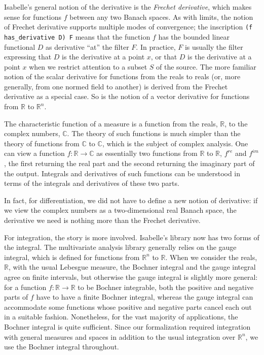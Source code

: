 \documentclass{svjour3}
\newcommand{\RR}{\mathbb{R}}
\newcommand{\CC}{\mathbb{C}}
\begin{document}
Isabelle's general notion of the derivative is the \emph{Frechet derivative}, which makes sense for functions $f$ between any two Banach spaces. As with limits, the notion of Frechet derivative supports multiple modes of convergence; the inscription \verb=(f has_derivative D) F= means that the function $f$ has the bounded linear functional $D$ as derivative ``at'' the filter $F$. In practice, $F$ is usually the filter expressing that $D$ is the derivative at a point $x$, or that $D$ is the derivative at a point $x$ when we restrict attention to a subset $S$ of the source. The more familiar notion of the scalar derivative for functions from the reals to reals (or, more generally, from one normed field to another) is derived from the Frechet derivative as a special case. So is the notion of a vector derivative for functions from $\RR$ to $\RR^n$.

The characteristic function of a measure is a function from the reals, $\RR$, to the complex numbers, $\CC$. The theory of such functions is much simpler than the theory of functions from $\CC$ to $\CC$, which is the subject of complex analysis. One can view a function $f : \RR \to \CC$ as essentially two functions from $\RR$ to $\RR$, $f^\mathit{re}$ and $f^\mathit{im}$, the first returning the real part and the second returning the imaginary part of the output. Integrals and derivatives of such functions can be understood in terms of the integrals and derivatives of these two parts.

In fact, for differentiation, we did not have to define a new notion of derivative: if we view the complex numbers as a two-dimensional real Banach space, the derivative we need is nothing more than the Frechet derivative. 

For integration, the story is more involved. Isabelle's library now has two forms of the integral. The multivariate analysis library generally relies on the gauge integral, which is defined for functions from $\RR^n$ to $\RR$. When we consider the reals, $\RR$, with the usual Lebesgue measure, the Bochner integral and the gauge integral agree on finite intervals, but otherwise the gauge integral is slightly more general: for a function $f : \RR \to \RR$ to be Bochner integrable, both the positive and negative parts of $f$ have to have a finite Bochner integral, whereas the gauge integral can accommodate some functions whose positive and negative parts cancel each out in a suitable fashion. Nonetheless, for the vast majority of applications, the Bochner integral is quite sufficient. Since our formalization required integration with general measures and spaces in addition to the usual integration over $\RR^n$, we use the Bochner integral throughout.
\end{document}
